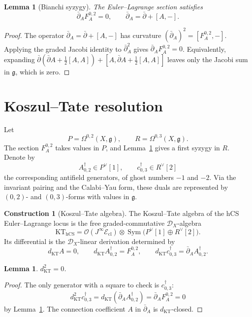 \documentclass[11pt]{amsart}
\providecommand{\cD}{\mathcal{D}}
\providecommand{\cE}{\mathcal{E}}
\providecommand{\cO}{\mathcal{O}}
\providecommand{\KT}{\mathrm{KT}}
\providecommand{\dbar}{\bar{\partial}}
\providecommand{\g}{\mathfrak{g}}
\providecommand{\hCS}{\mathrm{hCS}}
\providecommand{\Jinf}{J^{\infty}}
\theoremstyle{plain}
\newtheorem{lemma}[theorem]{Lemma}
\theoremstyle{definition}
\newtheorem{construction}[theorem]{Construction}
\begin{document}
\begin{lemma}[Bianchi syzygy]
\label{lem:bianchi}
The Euler--Lagrange section satisfies
\[
  \dbar_A F_A^{0,2}=0,\qquad
  \dbar_A=\dbar+[A,-].
\]
\end{lemma}

\begin{proof}
The operator \(\dbar_A=\dbar+[A,-]\) has curvature
\((\dbar_A)^2=[F_A^{0,2},-]\). Applying the graded Jacobi identity to
\(\dbar_A^2\) gives
\(\dbar_A F_A^{0,2}=0\). Equivalently, expanding
\(\dbar(\dbar A+\frac12[A,A])+[A,\dbar A+\frac12[A,A]]\) leaves only
the Jacobi sum in \(\g\), which is zero.
\end{proof}

\section{Koszul--Tate resolution}

Let
\[
  P=\Omega^{0,2}(X,\g),\qquad R=\Omega^{0,3}(X,\g).
\]
The section \(F_A^{0,2}\) takes values in \(P\), and
Lemma~\ref{lem:bianchi} gives a first syzygy in \(R\). Denote by
\[
  A^\dagger_{0,2}\in P^\vee[1],\qquad
  c^\dagger_{0,3}\in R^\vee[2]
\]
the corresponding antifield generators, of ghost numbers \(-1\) and
\(-2\). Via the invariant pairing and the Calabi--Yau form, these duals
are represented by \((0,2)\)- and \((0,3)\)-forms with values in
\(\g\).

\begin{construction}[Koszul--Tate algebra]
\label{cons:KT}
The Koszul--Tate algebra of the hCS Euler--Lagrange locus is the free
graded-commutative \(\cD_X\)-algebra
\[
  \KT_{\hCS}
  =
  \cO(\Jinf\cE_{\mathrm{cl}})
  \otimes
  \operatorname{Sym}\bigl(P^\vee[1]\oplus R^\vee[2]\bigr).
\]
Its differential is the \(\cD_X\)-linear derivation determined by
\[
  d_{\KT}A=0,\qquad
  d_{\KT}A^\dagger_{0,2}=F_A^{0,2},\qquad
  d_{\KT}c^\dagger_{0,3}=\dbar_A A^\dagger_{0,2}.
\]
\end{construction}

\begin{lemma}
\label{lem:KT-square}
\(d_{\KT}^2=0\).
\end{lemma}

\begin{proof}
The only generator with a square to check is \(c^\dagger_{0,3}\):
\[
  d_{\KT}^2c^\dagger_{0,3}
  =d_{\KT}(\dbar_AA^\dagger_{0,2})
  =\dbar_A F_A^{0,2}=0
\]
by Lemma~\ref{lem:bianchi}. The connection coefficient \(A\) in
\(\dbar_A\) is \(d_{\KT}\)-closed.
\end{proof}
\end{document}
